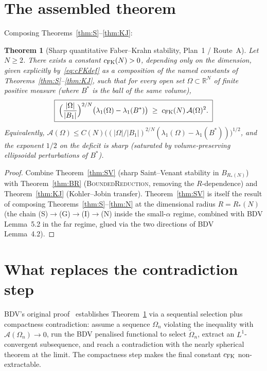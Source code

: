 \documentclass[11pt]{article}
\newtheorem{theorem}{Theorem}[section]
\theoremstyle{definition}
\newcommand{\R}{\mathbb{R}}
\newcommand{\Fr}{\mathcal{A}}
\newcommand{\Om}{\Omega}
\begin{document}
\section{The assembled theorem}\label{sec:assembled}

Composing Theorems~\ref{thm:S}--\ref{thm:KJ}:

\begin{theorem}[Sharp quantitative Faber--Krahn stability, Plan~1 /
Route~A]\label{thm:final}
Let $N\ge2$. There exists a constant $c_{\rm FK}(N)>0$, depending
only on the dimension, given explicitly by~\eqref{eq:cFKdef} as a
composition of the named constants of
Theorems~\ref{thm:S}--\ref{thm:KJ}, such that for every open set
$\Om\subset\R^{N}$ of finite positive measure (where $B^*$ is the ball
of the same volume),
\[
   \boxed{\;
   \Bigl(\frac{|\Om|}{|B_1|}\Bigr)^{2/N}
   \bigl(\lambda_1(\Om)-\lambda_1(B^*)\bigr)
   \;\ge\;c_{\rm FK}(N)\,\Fr(\Om)^2.
   \;}
\]
Equivalently, $\Fr(\Om)\le C(N)\bigl((|\Om|/|B_1|)^{2/N}
(\lambda_1(\Om)-\lambda_1(B^*))\bigr)^{1/2}$,
and the exponent $1/2$ on the deficit is sharp (saturated by
volume-preserving ellipsoidal perturbations of $B^*$).
\end{theorem}

\begin{proof}
Combine Theorem~\ref{thm:SV} (sharp Saint--Venant stability in
$B_{R_{*}(N)}$) with Theorem~\ref{thm:BR} (\textsc{BoundedReduction},
removing the $R$-dependence) and Theorem~\ref{thm:KJ}
(Kohler--Jobin transfer). Theorem~\ref{thm:SV} is itself the result
of composing Theorems~\ref{thm:S}--\ref{thm:N} at the dimensional
radius $R=R_{*}(N)$ (the chain (S)$\to$(G)$\to$(I)$\to$(N) inside the
small-$\alpha$ regime, combined with BDV Lemma~5.2 in the far regime,
glued via the two directions of BDV Lemma~4.2).
\end{proof}

\section{What replaces the contradiction step}\label{sec:replaces}

BDV's original proof~\cite{BDV} establishes Theorem~\ref{thm:final}
via a sequential selection plus compactness contradiction: assume a
sequence $\Om_n$ violating the inequality with $\Fr(\Om_n)\to0$, run
the BDV penalised functional to select $\widetilde\Om_n$, extract an
$L^1$-convergent subsequence, and reach a contradiction with the
nearly spherical theorem at the limit. The compactness step makes the
final constant $c_{\rm FK}$ non-extractable.
\end{document}
